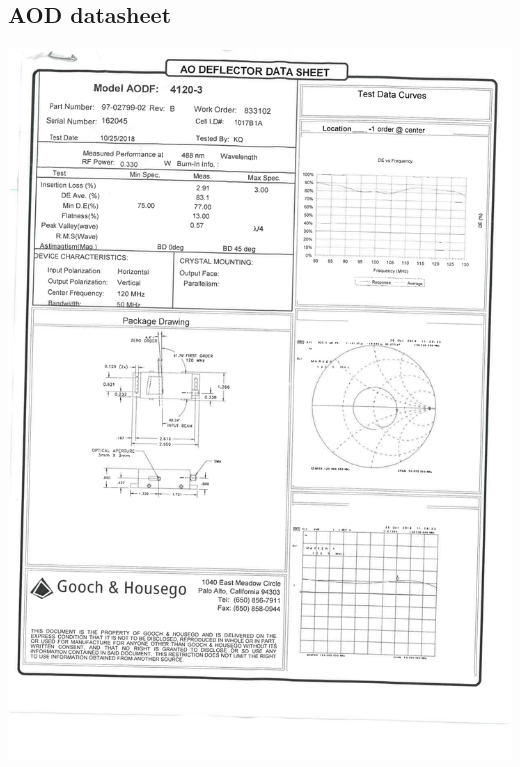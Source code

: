 \documentclass[english, a4paper, 12pt, twoside]{book}
\numberwithin{equation}{section} %
\begin{document}
\begin{appendices}
\chapter{AOD datasheet}
\includegraphics[scale=0.7]{SKM_C36819012815280}

\end{appendices}
\end{document}
